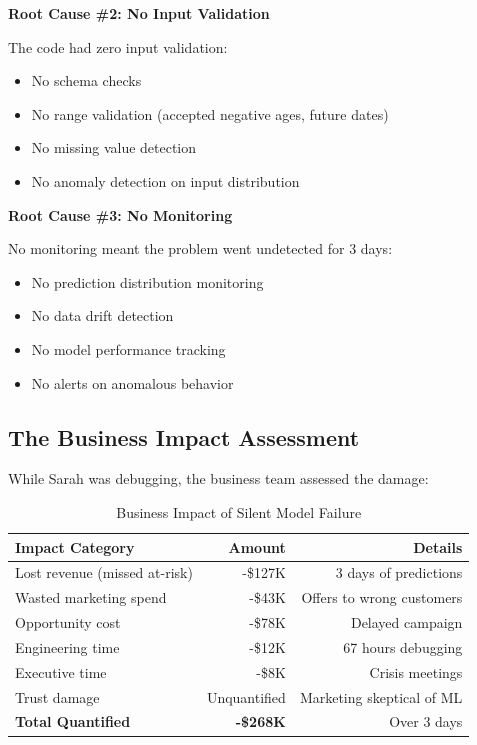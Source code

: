 \textbf{Root Cause \#2: No Input Validation}

The code had zero input validation:
\begin{itemize}
    \item No schema checks
    \item No range validation (accepted negative ages, future dates)
    \item No missing value detection
    \item No anomaly detection on input distribution
\end{itemize}

\textbf{Root Cause \#3: No Monitoring}

No monitoring meant the problem went undetected for 3 days:
\begin{itemize}
    \item No prediction distribution monitoring
    \item No data drift detection
    \item No model performance tracking
    \item No alerts on anomalous behavior
\end{itemize}

\subsection{The Business Impact Assessment}

While Sarah was debugging, the business team assessed the damage:

\begin{table}[h]
\centering
\caption{Business Impact of Silent Model Failure}
\begin{tabular}{lrr}
\toprule
\textbf{Impact Category} & \textbf{Amount} & \textbf{Details} \\
\midrule
Lost revenue (missed at-risk) & -\$127K & 3 days of predictions \\
Wasted marketing spend & -\$43K & Offers to wrong customers \\
Opportunity cost & -\$78K & Delayed campaign \\
Engineering time & -\$12K & 67 hours debugging \\
Executive time & -\$8K & Crisis meetings \\
Trust damage & Unquantified & Marketing skeptical of ML \\
\midrule
\textbf{Total Quantified} & \textbf{-\$268K} & Over 3 days \\
\bottomrule
\end{tabular}
\end{table}

